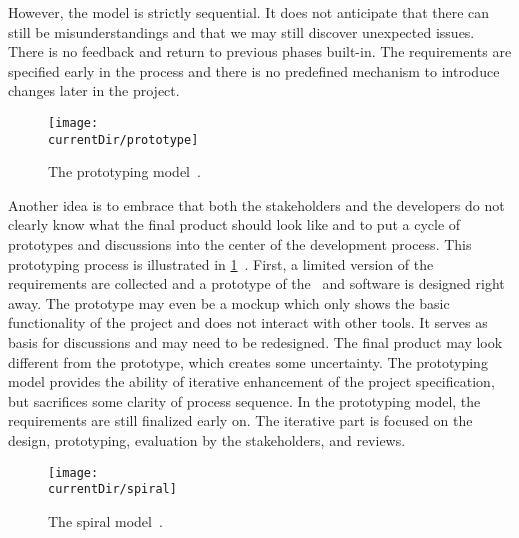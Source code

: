 However, the model is strictly sequential.
It does not anticipate that there can still be misunderstandings and that we may still discover unexpected issues.
There is no feedback and return to previous phases built-in.
The requirements are specified early in the process and there is no predefined mechanism to introduce changes later in the project.

\begin{figure}%
\centering%
\texttt{[image: \\currentDir/prototype]}%
\caption{The prototyping model~\cite{PA2009SETAP,GMTM2011DDLC}.}%
\label{fig:model:prototype}%
\end{figure}%
%
Another idea is to embrace that both the stakeholders and the developers do not clearly know what the final product should look like and to put a cycle of prototypes and discussions into the center of the development process.
This prototyping process is illustrated in \cref{fig:model:prototype}~\cite{PA2009SETAP,GMTM2011DDLC}.
First, a limited version of the requirements are collected and a prototype of the \db\ and software is designed right away.
The prototype may even be a mockup which only shows the basic functionality of the project and does not interact with other tools.
It serves as basis for discussions and may need to be redesigned.
The final product may look different from the prototype, which creates some uncertainty.
The prototyping model provides the ability of iterative enhancement of the project specification, but sacrifices some clarity of process sequence.
In the prototyping model, the requirements are still finalized early on.
The iterative part is focused on the design, prototyping, evaluation by the stakeholders, and reviews.

\begin{figure}%
\centering%
\texttt{[image: \\currentDir/spiral]}%
\caption{The spiral model~\cite{S2007OOSE,GMTM2011DDLC}.}%
\label{fig:model:spiral}%
\end{figure}%

